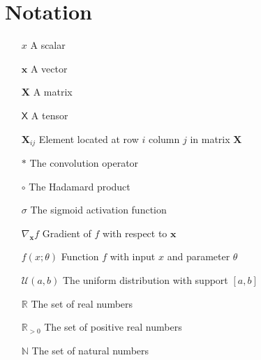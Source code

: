 \documentclass[./main.tex]{subfiles}
\begin{document}
\section*{Notation}
\begin{itemize}[leftmargin=2.0cm,labelsep=0.5cm]
    \item[$x$] A scalar
    \item[$\bm{x}$] A vector
    \item[$\bm{X}$] A matrix
    \item[$\mathsf{X}$] A tensor 
    \item[$\bm{X}_{ij}$] Element located at row $i$ column $j$ in matrix $\bm{X}$
    \item[$*$] The convolution operator
    \item[$\circ$] The Hadamard product  
    \item[$\sigma$] The sigmoid activation function 
    \item[$\nabla_{\bm{x}} f$] Gradient of $f$ with respect to $\bm{x}$
    \item[$f(x; \theta)$] Function $f$ with input $x$ and parameter $\theta$
    \item[$\mathcal{U}(a, b)$] The uniform distribution with support $[a, b]$
    \item[$\mathbb{R}$] The set of real numbers
    \item[$\mathbb{R}_{> 0}$] The set of positive real numbers
    \item[$\mathbb{N}$] The set of natural numbers
\end{itemize}
\end{document}
